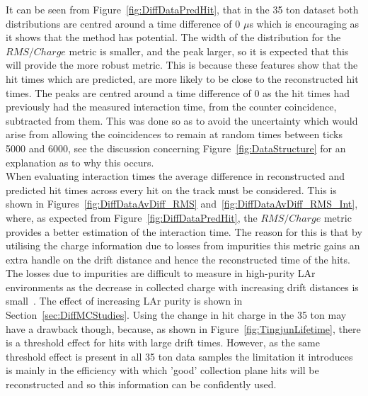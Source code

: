 It can be seen from Figure~\ref{fig:DiffDataPredHit}, that in the 35 ton dataset both distributions are centred around a time difference of 0 $\mu$s which is encouraging as it shows that the method has potential. The width of the distribution for the $RMS/Charge$ metric is smaller, and the peak larger, so it is expected that this will provide the more robust metric. This is because these features show that the hit times which are predicted, are more likely to be close to the reconstructed hit times. The peaks are centred around a time difference of 0 as the hit times had previously had the measured interaction time, from the counter coincidence, subtracted from them. This was done so as to avoid the uncertainty which would arise from allowing the coincidences to remain at random times between ticks 5000 and 6000, see the discussion concerning Figure~\ref{fig:DataStructure} for an explanation as to why this occurs. \\

When evaluating interaction times the average difference in reconstructed and predicted hit times across every hit on the track must be considered. This is shown in Figures~\ref{fig:DiffDataAvDiff_RMS} and~\ref{fig:DiffDataAvDiff_RMS_Int}, where, as expected from Figure~\ref{fig:DiffDataPredHit}, the $RMS/Charge$ metric provides a better estimation of the interaction time. The reason for this is that by utilising the charge information due to losses from impurities this metric gains an extra handle on the drift distance and hence the reconstructed time of the hits. The losses due to impurities are difficult to measure in high-purity LAr environments as the decrease in collected charge with increasing drift distances is small~\citep{LongBo}. The effect of increasing LAr purity is shown in Section~\ref{sec:DiffMCStudies}. Using the change in hit charge in the 35 ton may have a drawback though, because, as shown in Figure~\ref{fig:TingjunLifetime}, there is a threshold effect for hits with large drift times. However, as the same threshold effect is present in all 35 ton data samples the limitation it introduces is mainly in the efficiency with which 'good' collection plane hits will be reconstructed and so this information can be confidently used. \\

